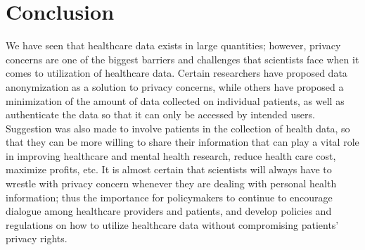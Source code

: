 \documentclass[sigconf]{acmart}
\begin{document}
 \section{Conclusion}

We have seen that healthcare data exists in large quantities; however, privacy concerns are one of the biggest barriers and challenges that  scientists face when it comes to utilization of healthcare data. Certain researchers have proposed data anonymization as a solution to privacy concerns, while others have proposed a minimization of the amount of data collected on individual patients, as well as authenticate the data so that it can only be accessed by intended users. Suggestion was also made to involve patients in the collection of health data, so that they can be more willing to share their information that can play a vital role in improving healthcare and mental health research, reduce health care cost, maximize profits, etc. It is almost certain that scientists will always have to wrestle with privacy concern whenever they are dealing with personal health information; thus the importance for policymakers to continue to encourage dialogue among healthcare providers and patients, and develop policies and regulations on how to utilize healthcare data without compromising patients' privacy rights. 


 
\end{document}

